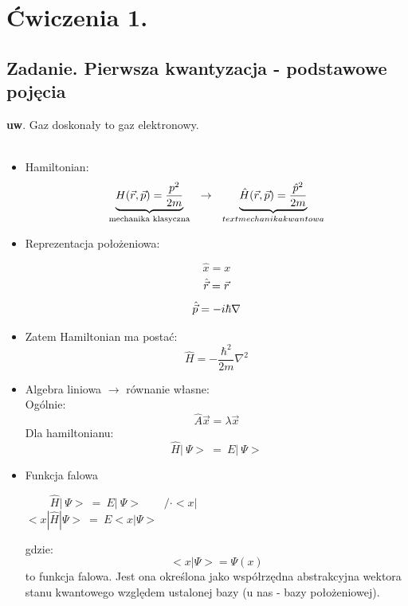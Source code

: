 \section{Ćwiczenia 1.}
\subsection{Zadanie. Pierwsza kwantyzacja - podstawowe pojęcia}
\textbf{uw}. Gaz doskonały to gaz elektronowy.\\\\
	\begin{itemize}
		\item Hamiltonian:
			\begin{equation} \underbrace{H(\vec{r},\vec{p})=\frac{p^2}{2m}}_{\text{mechanika klasyczna}} ~~\rightarrow~~ \underbrace{\hat{H}(\vec{r},\vec{p})=\frac{\hat{p}^2}{2m}}_{text{mechanika kwantowa}}\end{equation}
		\item Reprezentacja położeniowa:
		\begin{center}
			\begin{displaymath} \hat{x}=x \end{displaymath}
			\begin{displaymath} \hat{\vec{r}}=\vec{r} \end{displaymath}
			\begin{displaymath} \hat{\vec{p}}=-i\hbar\nabla \end{displaymath}
		\end{center}

		\item Zatem Hamiltonian ma postać:
			\begin{equation} \hat{H}=-\frac{\hbar^2}{2m}\nabla^2\end{equation}
		\item Algebra liniowa $\rightarrow$ równanie własne:\\
			Ogólnie:
			\begin{equation} \hat{A}\vec{x}=\lambda\vec{x}\end{equation}
			Dla hamiltonianu:
			\begin{equation}
			\hat{H}|~\Psi>~=~E|~\Psi>
			\end{equation}
	\item Funkcja falowa
			\begin{center}
			$~~~~~~~~~~\hat{H}|~\Psi>~=~E|~\Psi>~~~~~~~~~/\cdot<x|$\\
			$<x|\hat{H}|\Psi>~=~E<x|\Psi>$
			\end{center}	
			gdzie:
			\begin{equation} <x|\Psi>=\Psi(x)\end{equation}	
			to funkcja falowa. Jest ona określona jako współrzędna abstrakcyjna wektora stanu kwantowego względem ustalonej bazy (u nas - bazy położeniowej).
	\end{itemize}	
